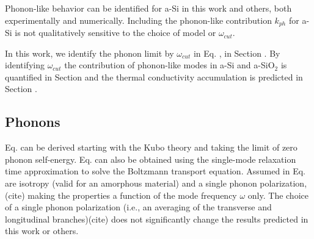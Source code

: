 \documentclass[aps,prb,twocolumn,superscriptaddress,footinbib,amsmath,amssymb,floatfix]{revtex4}
\begin{document}
Phonon-like behavior 
can be identified for a-Si in this work and others, 
both experimentally
\cite{liu_high_2009,yang_anomalously_2010,minnich_thermal_2011,
regner_broadband_2013} 
and numerically.
\cite{feldman_thermal_1993,feldman_numerical_1999,
mcgaughey_thermal_2004,he_heat_2011} 
Including the phonon-like contribution $k_{ph}$ 
for a-Si is not qualitatively sensitive 
to the choice of model
\cite{feldman_thermal_1993,feldman_numerical_1999,liu_high_2009} 
or $\omega_{cut}$.
\cite{feldman_thermal_1993,feldman_numerical_1999,
donadio_atomistic_2009,liu_high_2009,yang_anomalously_2010}

In this work, we identify the phonon limit by $\omega_{cut}$ in Eq. , 
in Section . By identifying $\omega_{cut}$   
the contribution of phonon-like modes in a-Si and 
a-SiO$_2$ is quantified in Section and the thermal conductivity accumulation 
is predicted in Section . 

\subsection{\label{S:Theory:Thermal:Phonons}Phonons}

Eq. can be derived starting 
with the Kubo theory
\cite{flicker_lattice_1973,allen_thermal_1993,alam_lattice_2005,
baldi_thermal_2008,yang_anomalously_2010} and taking the limit 
of zero phonon self-energy.\cite{baldi_thermal_2008} 
Eq. can also be obtained using the single-mode relaxation
time approximation to solve 
the Boltzmann transport equation.\cite{ziman_electrons_2001}  
Assumed in Eq. 
are isotropy (valid for an amorphous material) and a single phonon 
polarization,(cite) making the  
properties a function of the mode frequency $\omega$ only. The 
choice of a single phonon polarization (i.e., an averaging 
of the transverse and longitudinal branches)(cite) does not 
significantly change 
the results predicted in this work or others.
\cite{feldman_thermal_1993,cahill_thermal_1994,
feldman_numerical_1999,baldi_thermal_2008,liu_high_2009,
yang_anomalously_2010} 
\end{document}

